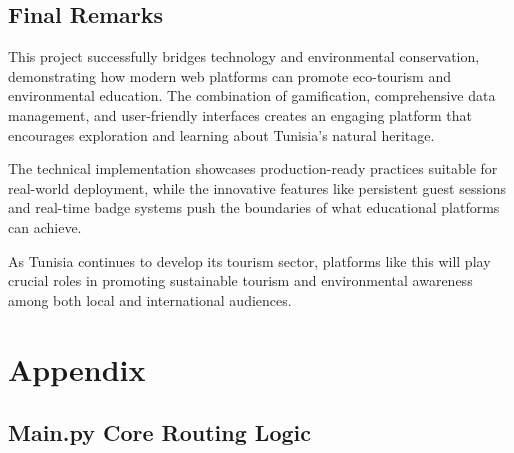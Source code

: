 \documentclass[11pt,a4paper]{article}
\begin{document}
\subsection{Final Remarks}

This project successfully bridges technology and environmental conservation, demonstrating how modern web platforms can promote eco-tourism and environmental education. The combination of gamification, comprehensive data management, and user-friendly interfaces creates an engaging platform that encourages exploration and learning about Tunisia's natural heritage.

The technical implementation showcases production-ready practices suitable for real-world deployment, while the innovative features like persistent guest sessions and real-time badge systems push the boundaries of what educational platforms can achieve.

As Tunisia continues to develop its tourism sector, platforms like this will play crucial roles in promoting sustainable tourism and environmental awareness among both local and international audiences.

\newpage

\section*{Appendix}

\subsection{Main.py Core Routing Logic}
\end{document}
